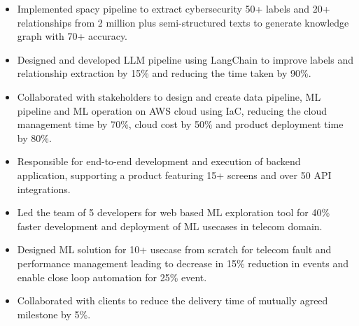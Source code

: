 \documentclass[10pt,a4paper,ragged2e,withhyper]{altacv}
\author{Madhusudan Kumar}
\date{\today}
\title{}
\begin{document}

\makecvheader

\label{sec:org3596071}

\label{sec:org40f3598}

\begin{itemize}
\item Implemented spacy pipeline to extract cybersecurity 50+ labels and 20+ relationships from 2 million plus semi-structured texts to generate knowledge graph with 70+ accuracy.
\item Designed and developed LLM pipeline using LangChain to improve labels and relationship extraction by 15\% and reducing the time taken by 90\%.
\item Collaborated with stakeholders to design and create data pipeline, ML pipeline and ML operation on AWS cloud using IaC, reducing the cloud management time by 70\%, cloud cost by 50\% and product deployment time by 80\%.
\item Responsible for end-to-end development and execution of backend application, supporting a product featuring 15+ screens and over 50 API integrations.
\end{itemize}

\begin{itemize}
\item Led the team of 5 developers for web based ML exploration tool for 40\% faster development and deployment of ML usecases in telecom domain.
\item Designed ML solution for 10+ usecase from scratch for telecom fault and performance management leading to decrease in 15\% reduction in events and enable close loop automation for 25\% event.
\item Collaborated with clients to reduce the delivery time of mutually agreed milestone by 5\%.
\end{itemize}
\end{document}
